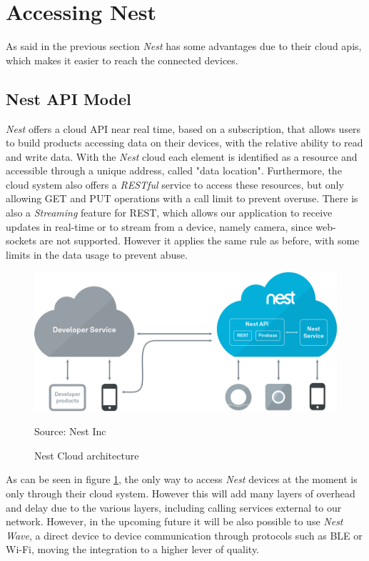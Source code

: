\section{Accessing Nest}

As said in the previous section \textit{Nest} has some advantages
due to their cloud apis, which makes it easier to reach the connected devices.

\subsection{Nest API Model}

\textit{Nest} offers a cloud API near real time, based on a subscription, that allows
users to build products accessing data on their devices, with the relative ability
to read and write data. With the \textit{Nest} cloud each element is identified as a resource
and accessible through a unique address, called "data location".
Furthermore, the cloud system also offers a \textit{RESTful} service to access these resources,
but only allowing GET and PUT operations with a call limit to prevent overuse. There is also
a \textit{Streaming} feature for REST, which allows our application to receive updates
in real-time or to stream from a device, namely camera, since web-sockets are not supported.
However it applies the same rule as before, with some limits in the data usage to prevent abuse.



\begin{figure}[h]
\caption{Nest Cloud architecture}
\label{fig:nestarch}
\centering
\includegraphics[scale=0.35]{nest-architecture.png}
\par{Source: Nest Inc}
\end{figure}

As can be seen in figure \ref{fig:nestarch}, the only way to access \textit{Nest} devices at the
moment is only through their cloud system. However this will add many layers of overhead
and delay due to the various layers, including calling services external to our network. However,
in the upcoming future it will be also possible to use \textit{Nest Wave}, a direct device
to device communication through protocols such as BLE or Wi-Fi, moving the integration to a higher
lever of quality.



